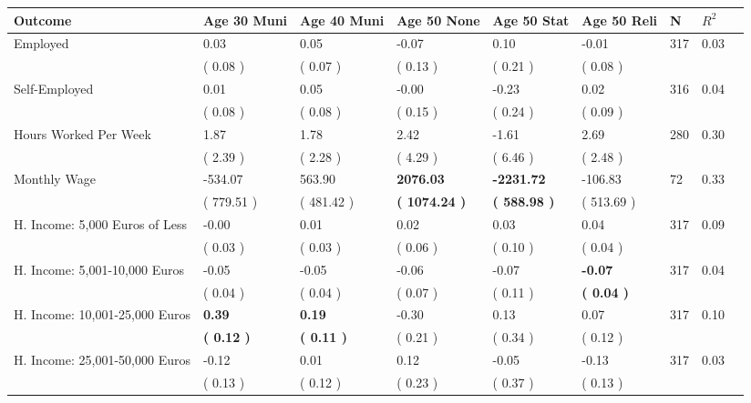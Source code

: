 \begin{tabular}{L{6.2cm} C{1.8cm} C{1.8cm} C{1.8cm} C{1.8cm} C{1.8cm} C{1.8cm} C{0.3cm} C{0.3cm}}
\toprule
 \textbf{Outcome} & \textbf{Age 30 Muni} & \textbf{Age 40 Muni} & \textbf{Age 50 None} & \textbf{Age 50 Stat} & \textbf{Age 50 Reli} & \textbf{N} & \textbf{$ R^2$} \\
\midrule
Employed &      0.03 &      0.05 &     -0.07 &      0.10 &     -0.01  & 317 &       0.03 \\ 
 & (     0.08 ) & (     0.07 ) & (     0.13 ) & (     0.21 ) & (     0.08 )  & \\
Self-Employed &      0.01 &      0.05 &     -0.00 &     -0.23 &      0.02  & 316 &       0.04 \\ 
 & (     0.08 ) & (     0.08 ) & (     0.15 ) & (     0.24 ) & (     0.09 )  & \\
Hours Worked Per Week &      1.87 &      1.78 &      2.42 &     -1.61 &      2.69  & 280 &       0.30 \\ 
 & (     2.39 ) & (     2.28 ) & (     4.29 ) & (     6.46 ) & (     2.48 )  & \\
Monthly Wage &   -534.07 &    563.90 & \textbf{  2076.03} & \textbf{ -2231.72} &   -106.83  & 72 &       0.33 \\ 
 & (   779.51 ) & (   481.42 ) & \textbf{(  1074.24 )} & \textbf{(   588.98 )} & (   513.69 )  & \\
H. Income: 5,000 Euros of Less &     -0.00 &      0.01 &      0.02 &      0.03 &      0.04  & 317 &       0.09 \\ 
 & (     0.03 ) & (     0.03 ) & (     0.06 ) & (     0.10 ) & (     0.04 )  & \\
H. Income: 5,001-10,000 Euros &     -0.05 &     -0.05 &     -0.06 &     -0.07 & \textbf{    -0.07}  & 317 &       0.04 \\ 
 & (     0.04 ) & (     0.04 ) & (     0.07 ) & (     0.11 ) & \textbf{(     0.04 )}  & \\
H. Income: 10,001-25,000 Euros & \textbf{     0.39} & \textbf{     0.19} &     -0.30 &      0.13 &      0.07  & 317 &       0.10 \\ 
 & \textbf{(     0.12 )} & \textbf{(     0.11 )} & (     0.21 ) & (     0.34 ) & (     0.12 )  & \\
H. Income: 25,001-50,000 Euros &     -0.12 &      0.01 &      0.12 &     -0.05 &     -0.13  & 317 &       0.03 \\ 
 & (     0.13 ) & (     0.12 ) & (     0.23 ) & (     0.37 ) & (     0.13 )  & \\

\end{tabular}
